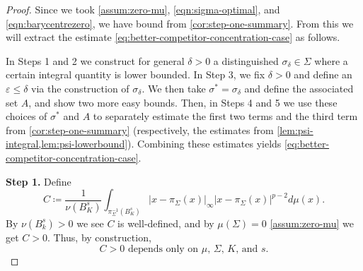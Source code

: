 \documentclass[preprint, reqno]{amsart}
\renewcommand{\epsilon}{\varepsilon}
\theoremstyle{definition}
\numberwithin{equation}{section}
\begin{document}
\begin{proof}
  Since we took \eqref{assum:zero-mu}, \eqref{eqn:sigma-optimal}, and
  \eqref{eqn:barycentrezero}, we have bound from
  \cref{cor:step-one-summary}. From this we will extract the estimate
  \eqref{eq:better-competitor-concentration-case} as follows.

  In Steps 1 and 2 we construct for general $\delta > 0$ a
  distinguished $\sigma_\delta \in \Sigma$ where a certain integral
  quantity is lower bounded. In Step 3, we fix $\delta > 0$ and define
  an $\epsilon \leq \delta$ via the construction of $\sigma_\delta$.
  We then take $\sigma^* = \sigma_\delta$ and define the associated
  set $A$, and show two more easy bounds. Then, in Steps 4 and 5 we
  use these choices of $\sigma^*$ and $A$ to separately estimate the
  first two terms and the third term from \cref{cor:step-one-summary}
  (respectively, the estimates from
  \cref{lem:psi-integral,lem:psi-lowerbound}). Combining these
  estimates yields \eqref{eq:better-competitor-concentration-case}.


  \textbf{Step 1.} Define
  \[
    C \coloneqq \frac{1}{\nu(B_K^s)} \int_{\pi_{\Sigma}^{-1}(B_K^s)}
    |x-\pi_\Sigma (x)|_{\infty} |x-\pi_{\Sigma}(x)|^{p-2} d\mu(x).
  \]
  By $\nu(B_k^s) > 0$
  we see $C$ is well-defined, and by $\mu(\Sigma) = 0$
  \eqref{assum:zero-mu} we get $C > 0$. Thus, by construction,
  \[
    C>0 \text{ depends only on $\mu$, $\Sigma$, $K$, and $s$.}
  \]


\end{proof}
\end{document}
